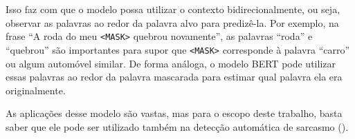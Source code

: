 Isso faz com que o modelo possa utilizar o contexto bidirecionalmente, ou seja,
observar as palavras ao redor da palavra alvo para predizê-la. Por exemplo, na
frase ``A roda do meu \texttt{<MASK>} quebrou novamente'', as palavras ``roda''
e ``quebrou'' são importantes para supor que \texttt{<MASK>} corresponde à
palavra ``carro'' ou algum automóvel similar. De forma análoga, o modelo
BERT pode utilizar essas palavras ao redor da palavra mascarada para estimar
qual palavra ela era originalmente.

As aplicações desse modelo são vastas, mas para o escopo deste trabalho, basta
saber que ele pode ser utilizado também na detecção automática de sarcasmo
(\cite{yaghoobian:2021:sarcasm-detection-comparative-study}).
